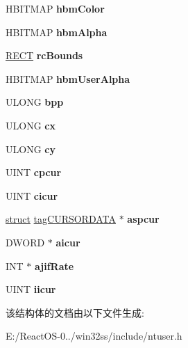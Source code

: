 \begin{DoxyCompactItemize}
\mbox{\label{structtag_c_u_r_s_o_r_d_a_t_a_a7662d9ad531488f4b8d1485ec6aa3698}} 
H\+B\+I\+T\+M\+AP {\bfseries hbm\+Color}
\item 
\mbox{\label{structtag_c_u_r_s_o_r_d_a_t_a_a9934c49c2bc57f7ec30ce15fe2051084}} 
H\+B\+I\+T\+M\+AP {\bfseries hbm\+Alpha}
\item 
\mbox{\label{structtag_c_u_r_s_o_r_d_a_t_a_a86de50c6f87d1e42885b09ed04adfc16}} 
\hyperlink{structtag_r_e_c_t}{R\+E\+CT} {\bfseries rc\+Bounds}
\item 
\mbox{\label{structtag_c_u_r_s_o_r_d_a_t_a_aa65b8fd29830392118805580dd62e5c4}} 
H\+B\+I\+T\+M\+AP {\bfseries hbm\+User\+Alpha}
\item 
\mbox{\label{structtag_c_u_r_s_o_r_d_a_t_a_a3b9cbc4a3b270fcc360858bbf9342afc}} 
U\+L\+O\+NG {\bfseries bpp}
\item 
\mbox{\label{structtag_c_u_r_s_o_r_d_a_t_a_a51b7644205b376b3859731365868be82}} 
U\+L\+O\+NG {\bfseries cx}
\item 
\mbox{\label{structtag_c_u_r_s_o_r_d_a_t_a_a4442ee263e2a05a94826afe1e33c6b41}} 
U\+L\+O\+NG {\bfseries cy}
\item 
\mbox{\label{structtag_c_u_r_s_o_r_d_a_t_a_a4614d0e763e1a0c1ff3ae32561f33181}} 
U\+I\+NT {\bfseries cpcur}
\item 
\mbox{\label{structtag_c_u_r_s_o_r_d_a_t_a_aee9ff92ad063f06d9f365452f9bddfe5}} 
U\+I\+NT {\bfseries cicur}
\item 
\mbox{\label{structtag_c_u_r_s_o_r_d_a_t_a_af04f2fd6e0ad4b7e486f765aedc50c99}} 
\hyperlink{interfacestruct}{struct} \hyperlink{structtag_c_u_r_s_o_r_d_a_t_a}{tag\+C\+U\+R\+S\+O\+R\+D\+A\+TA} $\ast$ {\bfseries aspcur}
\item 
\mbox{\label{structtag_c_u_r_s_o_r_d_a_t_a_a386b2871b67746afb82b1642990773e2}} 
D\+W\+O\+RD $\ast$ {\bfseries aicur}
\item 
\mbox{\label{structtag_c_u_r_s_o_r_d_a_t_a_a3daaf24211baaabeaca3f992281fa431}} 
I\+NT $\ast$ {\bfseries ajif\+Rate}
\item 
\mbox{\label{structtag_c_u_r_s_o_r_d_a_t_a_ad9797a407fce53dca777544d22f6235d}} 
U\+I\+NT {\bfseries iicur}
\end{DoxyCompactItemize}


该结构体的文档由以下文件生成\+:\begin{DoxyCompactItemize}
\item 
E\+:/\+React\+O\+S-\/0../win32ss/include/ntuser.\+h\end{DoxyCompactItemize}
